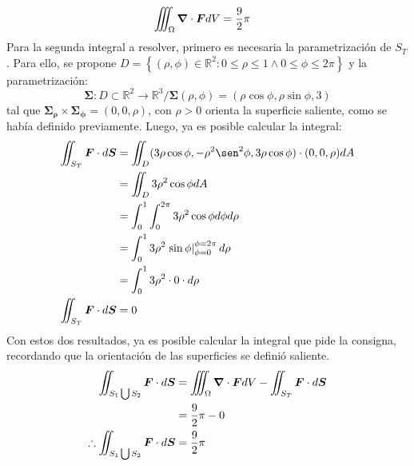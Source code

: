 \begin{solution}
\begin{align*}
        \iiint_{\Omega} \grad \cdot \boldsymbol{F} dV&= \frac{9}{2}\pi
    \end{align*}
    Para la segunda integral a resolver, primero es necesaria la parametrización de $S_T$. Para ello, se propone 
    $D=\left\{(\rho,\phi) \in \mathbb{R}^2 : 0\leq\rho\leq1 \land 0\leq\phi\leq2\pi\right\}$ y la parametrización:
    \begin{equation*}
        \boldsymbol{\Sigma} : D \subset \mathbb{R}^2 \longrightarrow \mathbb{R}^3 / \boldsymbol{\Sigma}(\rho,\phi) = \left(\rho\cos{\phi},\rho\sin{\phi},3\right)
    \end{equation*}
    tal que $\boldsymbol{\Sigma_{\rho}}\times\boldsymbol{\Sigma_{\phi}} = \left(0,0,\rho\right)$, con $\rho>0$ orienta la superficie saliente, como se había definido previamente.
    Luego, ya es posible calcular la integral:
    \begin{align*}
        \iint_{S_T} \boldsymbol{F} \cdot d\boldsymbol{S} &= \iint_{D} (3\rho\cos{\phi},-\rho^2\sen^2{\phi},3\rho\cos{\phi}) \cdot (0,0,\rho)dA\\
        &= \iint_{D} 3\rho^2\cos{\phi}dA\\
        &= \int_{0}^{1} \int_{0}^{2\pi} 3\rho^2\cos{\phi} d\phi d\rho\\
        &= \int_{0}^{1} 3\rho^2\left.\sin{\phi}\right|_{\phi=0}^{\phi=2\pi} d\rho \\
        &= \int_{0}^{1} 3\rho^2\cdot 0 \cdot d\rho\\
        \iint_{S_T} \boldsymbol{F} \cdot d\boldsymbol{S} &= 0 \\
    \end{align*}
    Con estos dos resultados, ya es posible calcular la integral que pide la consigna, recordando que la orientación de las superficies se definió saliente.
    \begin{align*}
        \iint_{S_1 \bigcup S_2} \boldsymbol{F} \cdot d\boldsymbol{S} &= \iiint_{\Omega} \grad \cdot \boldsymbol{F} dV - \iint_{S_T} \boldsymbol{F} \cdot d\boldsymbol{S}\\
        &= \frac{9}{2}\pi - 0\\
        \therefore \iint_{S_1 \bigcup S_2} \boldsymbol{F} \cdot d\boldsymbol{S} &= \frac{9}{2}\pi
    \end{align*}
\end{solution}


